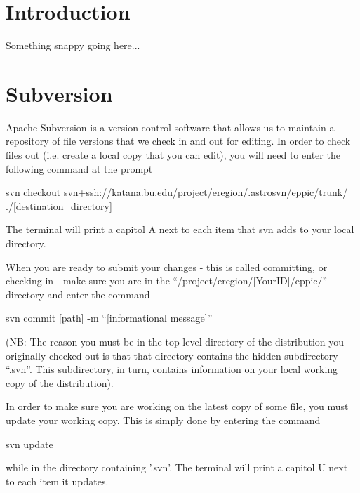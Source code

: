 

\chapter{Introduction}

Something snappy going here...

\chapter{Subversion}
Apache Subversion is a version control software that allows us to maintain a repository of file versions that we check in and out for editing. In order to check files out (i.e. create a local copy that you can edit), you will need to enter the 
following command at the prompt
\begin{center} svn checkout svn+ssh://katana.bu.edu/project/eregion/.astrosvn/eppic/trunk/ ./[destination_directory] \end{center}
The terminal will print a capitol A next to each item that svn adds to your local directory.

When you are ready to submit your changes - this is called committing, or checking in - make sure you are in the ``/project/eregion/[YourID]/eppic/'' directory and enter the command
\begin{center} svn commit [path] -m ``[informational message]'' \end{center}
(NB: The reason you must be in the top-level directory of the distribution you originally checked out is that that directory contains the hidden subdirectory ``.svn''. This subdirectory, in turn, contains information on your local working copy of the distribution). 

In order to make sure you are working on the latest copy of some file, you must update your working copy. This is simply done by entering the command
\begin{center} svn update \end{center}
while in the directory containing '.svn'. The terminal will print a capitol U next to each item it updates.